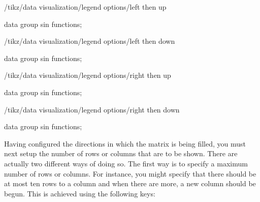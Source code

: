 \begin{key}{/tikz/data visualization/legend options/left then up}
\begin{codeexample}[width=6cm]
\tikz \datavisualization [
  visualize as smooth line/.list={1,2,3,4,5,6,7,8},
  legend example, style sheet=vary hue,
  main legend={left then up, columns=3}]
data group {sin functions};
\end{codeexample}
\end{key}

\begin{key}{/tikz/data visualization/legend options/left then down}
\begin{codeexample}[width=6cm]
\tikz \datavisualization [
  visualize as smooth line/.list={1,2,3,4,5,6,7,8},
  legend example, style sheet=vary hue,
  main legend={left then down, columns=3}]
data group {sin functions};
\end{codeexample}
\end{key}

\begin{key}{/tikz/data visualization/legend options/right then up}
\begin{codeexample}[width=6cm]
\tikz \datavisualization [
  visualize as smooth line/.list={1,2,3,4,5,6,7,8},
  legend example, style sheet=vary hue,
  main legend={right then up, columns=3}]
data group {sin functions};
\end{codeexample}
\end{key}

\begin{key}{/tikz/data visualization/legend options/right then down}
\begin{codeexample}[width=6cm]
\tikz \datavisualization [
  visualize as smooth line/.list={1,2,3,4,5,6,7,8},
  legend example, style sheet=vary hue,
  main legend={right then down, columns=3}]
data group {sin functions};
\end{codeexample}
\end{key}


Having configured the directions in which the matrix is being filled,
you must next setup the number of rows or columns that are to be
shown. There are actually two different ways of doing so. The first
way is to specify a maximum number of rows or columns. For instance,
you might specify that there should be at most ten rows to a column
and when there are more, a new column should be begun. This is
achieved using the following keys:

